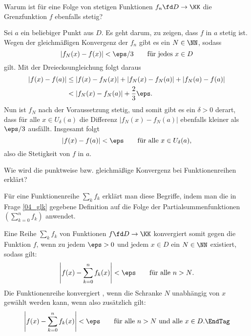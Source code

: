 \begin{frage}\label{04_stet}
Warum ist für eine  Folge 
von stetigen Funktionen $f_n \fd D\to \KK$ die Grenzfunktion $f$ ebenfalls 
stetig?
\end{frage}

\begin{antwort}
 Sei $a$ ein beliebiger Punkt aus $D$. Es geht darum, zu zeigen, 
dass $f$ in $a$ stetig ist.  
Wegen der gleichmäßigen Konvergenz der $f_n$ 
gibt es ein $N\in \NN$, sodass  
\[
|f_N(x)-f(x)|<\eps/3
\qquad\text{für jedes $x\in D$}
\] 
gilt. Mit der Dreiecksungleichung folgt daraus 
\begin{align*}
|f(x)-f(a)| &\le |f(x)-f_N(x)| + |f_N(x)-f_N(a)| + |f_N(a)-f(a)| \\
&< |f_N(x)-f_N(a)| + \frac{2}{3}\eps. 
\end{align*}
Nun ist $f_N$ nach der Voraussetzung stetig, und somit 
gibt es ein $\delta>0$ derart, dass für alle $x\in U_\delta(a)$ 
die Differenz $|f_N(x)-f_N(a)|$ 
ebenfalls kleiner als $\eps/3$ ausfällt. Insgesamt folgt  
\[
|f(x)-f(a)| < \eps \qquad\text{für alle $x\in U_\delta(a)$},
\]
also die Stetigkeit von $f$ in $a$.
\AntEnd
\end{antwort}

\begin{frage}
Wie wird die punktweise bzw. gleichmäßige Konvergenz bei Funktionenreihen 
erklärt?
\end{frage}

\begin{antwort}
Für eine Funktionenreihe $\sum_{k} f_k$ erklärt man diese Begriffe, 
indem man die in Frage \ref{04_glk} gegebene Definition 
auf die Folge der Partialsummenfunktionen 
$\left( \sum_{k=0}^n f_k \right)$ anwendet. 

Eine Reihe $\sum_k f_k$ von Funktionen 
$f\fd D\to \KK$ konvergiert somit 
 gegen die 
Funktion $f$, wenn zu jedem $\eps>0$ und jedem $x\in D$ 
ein $N\in\NN$ existiert, sodass gilt:
\[
\left| f(x) - \sum_{k=0}^n f_k(x) \right| < \eps 
\qquad\text{für alle $n>N$}. 
\]
Die Funktionenreihe 
konvergiert , 
wenn die Schranke $N$ unabhängig von $x$ gewählt 
werden kann, wenn also zusätzlich gilt:
\begin{equation}
\left| f(x) - \sum_{k=0}^n f_k(x)\right| < \eps 
\qquad\text{für alle $n>N$ und alle $x\in D$}. \EndTag
\end{equation}
\end{antwort}

